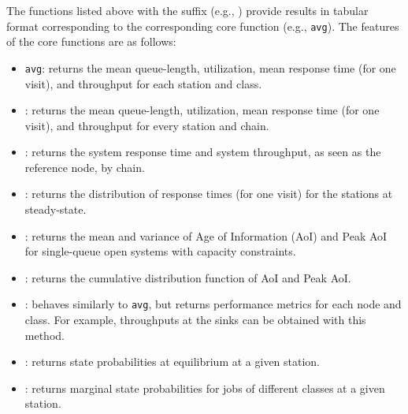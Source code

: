 The functions listed above with the  suffix (e.g., ) provide results in tabular format corresponding to the corresponding core function (e.g., \texttt{avg}). The features of the core functions are as follows:
\begin{itemize}
\item \texttt{avg}: returns the mean queue-length, utilization, mean response time (for one visit), and throughput for each station and class.
\item {}: returns the mean queue-length, utilization, mean response time (for one visit), and throughput for every station and chain.
\item {}: returns the system response time and system throughput, as seen as the reference node, by chain.
\item {}: returns the distribution of response times (for one visit) for the stations at steady-state.
\item {}: returns the mean and variance of Age of Information (AoI) and Peak AoI for single-queue open systems with capacity constraints.
\item {}: returns the cumulative distribution function of AoI and Peak AoI.
\item {}: behaves similarly to \texttt{avg}, but returns performance metrics for each node and class. For example, throughputs at the sinks can be obtained with this method.
\item {}: returns state probabilities at equilibrium at a given station.
\item {}: returns marginal state probabilities for jobs of different classes at a given station.

\end{itemize}

